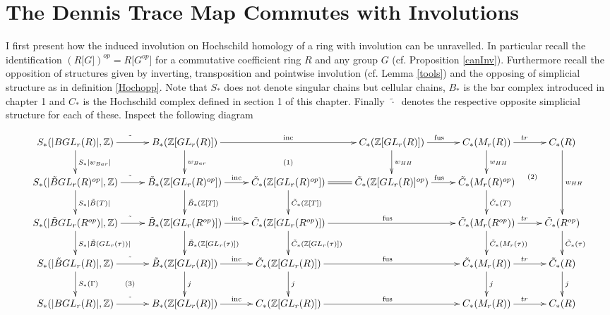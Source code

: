 \section{The Dennis Trace Map Commutes with Involutions}
I first present how the induced involution on Hochschild homology of a ring with involution can be unravelled. In particular recall the
identification $(R\lbrack G \rbrack)^{op} = R\lbrack G^{op}\rbrack$ for a commutative coefficient ring $R$ and any
group $G$ (cf. Proposition \ref{canInv}). Furthermore recall the opposition of structures given by inverting, transposition
and pointwise involution (cf. Lemma \ref{tools}) and the opposing of simplicial structure as in definition \ref{Hochopp}.
Note that $S_*$ does not denote singular chains but cellular chains, $B_*$ is the bar complex introduced
in chapter 1 and $C_*$ is the Hochschild complex defined in section 1 of this chapter.
Finally $~{\tilde{\cdot}}~$ denotes the respective opposite simplicial structure for each of these.
Inspect the following diagram

\begin{landscape}
$$
\xymatrix{
S_*(|BGL_r(R)|,\Z) \ar[r]^{\tilde{}} \ar[d]^{S_*|w_{Bar}|}& B_*(\Z\lbrack GL_r(R) \rbrack) \ar[rr]^{\mathrm{inc}} \ar@{}[drr]|{(1)} \ar[d]^{w_{Bar}} & &
                C_*(\Z\lbrack GL_r(R) \rbrack) \ar[r]^{\mathrm{fus}} \ar[d]^{w_{HH}}  & C_*(M_r(R)) \ar@{}[ddr]^{(2)} \ar[d]^{w_{HH}} \ar[r]^{tr} &  C_*(R) \ar[dd]^{w_{HH}} \\
S_*(|\tilde{B}GL_r(R)^{op}|,\Z) \ar[r]^{\tilde{}} \ar[d]^{S_*|\tilde{B}(T)|}& \tilde{B}_*(\Z\lbrack GL_r(R)^{op}\rbrack ) \ar[r]^{\mathrm{inc}} \ar[d]^{\tilde{B}_*(\Z\lbrack T \rbrack)} &\tilde{C}_*(\Z\lbrack GL_r(R)^{op} \rbrack) \ar@{=}[r] \ar[d]^{\tilde{C}_*(\Z\lbrack T \rbrack)} &
                \tilde{C}_*(\Z\lbrack GL_r(R) \rbrack^{op})  \ar[r]^{\mathrm{fus}}& \tilde{C}_*(M_r(R)^{op})\ar[d]^{\tilde{C}_*(T)}&\\
S_*(|\tilde{B}GL_r(R^{op})|,\Z) \ar[r]^{\tilde{}} \ar[d]^{S_*|\tilde{B}(GL_r(\tau))|} & \tilde{B}_*(\Z\lbrack GL_r(R^{op})\rbrack ) \ar[r]^{\mathrm{inc}} \ar[d]^{\tilde{B}_*(\Z\lbrack GL_r(\tau) \rbrack)} &\tilde{C}_*(\Z\lbrack GL_r(R^{op}) \rbrack) \ar[d]^{\tilde{C}_*(\Z\lbrack GL_r(\tau) \rbrack)} \ar[rr]^{\mathrm{fus}}
                &              &\tilde{C}_*(M_r(R^{op}))\ar[d]^{\tilde{C}_*(M_r(\tau))} \ar[r]^{tr}& \tilde{C}_*(R^{op}) \ar[d]^{\tilde{C}_*(\tau)}\\
S_*(|\tilde{B}GL_r(R)|,\Z) \ar@{}[dr]|{(3)} \ar[r]^{\tilde{}} \ar[d]^{S_*(\Gamma)} & \tilde{B}_*(\Z\lbrack GL_r(R)\rbrack ) \ar[r]^{\mathrm{inc}} \ar[d]^j&\tilde{C}_*(\Z\lbrack GL_r(R) \rbrack) \ar[rr]^{\mathrm{fus}} \ar[d]^j
                &              &\tilde{C}_*(M_r(R)) \ar[r]^{tr} \ar[d]^j& \tilde{C}_*(R) \ar[d]^j \\
S_*(|BGL_r(R)|,\Z) \ar[r]^{\tilde{}} & B_*(\Z\lbrack GL_r(R)\rbrack ) \ar[r]^{\mathrm{inc}} &C_*(\Z\lbrack GL_r(R) \rbrack) \ar[rr]^{\mathrm{fus}}
                &              &C_*(M_r(R)) \ar[r]^{tr}& C_*(R)
}\label{diagr}
$$
\end{landscape}

